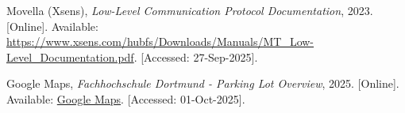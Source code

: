 \begin{thebibliography}{00}
Movella (Xsens),  
\textit{Low-Level Communication Protocol Documentation},  
2023. [Online]. Available: \url{https://www.xsens.com/hubfs/Downloads/Manuals/MT_Low-Level_Documentation.pdf}. [Accessed: 27-Sep-2025].  

Google Maps, 
\emph{Fachhochschule Dortmund - Parking Lot Overview}, 
2025. [Online]. Available: \href{https://www.google.com/maps/search/fh+dortmund/@51.5061964,7.4567,105m/data=!3m1!1e3?entry=ttu&g_ep=EgoyMDI1MDkyOC4wIKXMDSoASAFQAw%3D%3D}{Google Maps}. 
[Accessed: 01-Oct-2025].


\end{thebibliography}